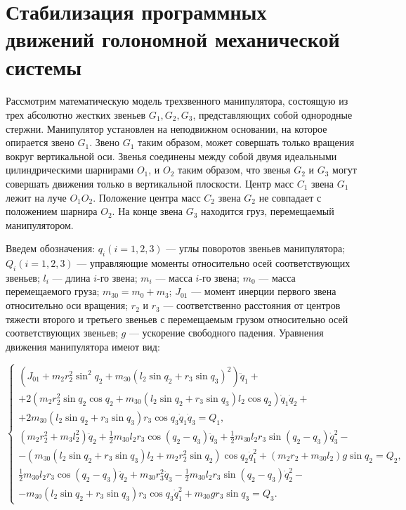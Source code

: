 \section{Стабилизация программных движений голономной механической системы } \label{p31}
\paragraph{}
 Рассмотрим математическую модель трехзвенного манипулятора, состоящую из трех абсолютно жестких звеньев $G_1, G_2, G_3$, представляющих собой однородные стержни. Манипулятор установлен на неподвижном основании, на которое опирается звено $G_1$. Звено $G_1$ таким образом, может совершать только вращения вокруг вертикальной оси. Звенья соединены между собой двумя идеальными цилиндрическими шарнирами $O_1$, и $O_2$ таким образом, что звенья $G_2$ и $G_3$ могут совершать движения только в вертикальной плоскости. Центр масс $C_1$ звена $G_1$ лежит на луче  $O_1 O_2$. Положение центра масс $C_2$ звена $G_2$ не совпадает с положением шарнира $O_2$. На конце звена $G_3$ находится груз, перемещаемый манипулятором.
 
 Введем обозначения: $q_i (i=1, 2, 3)$ --- углы поворотов звеньев манипулятора; $Q_i (i = 1, 2, 3)$ ---  управляющие моменты относительно осей соответствующих звеньев; $l_i$  ---  длина   $i$-го звена;   $m_i$ --- масса  $i$-го звена;    $m_0$ ---  масса перемещаемого груза;  $m_{30} = m_0 + m_3$; $J_{01}$  ---  момент инерции первого звена относительно оси вращения; $r_2$ и $r_3$ --- соответственно расстояния от центров тяжести второго и третьего звеньев с перемещаемым грузом относительно осей соответствующих звеньев; $g$ --- ускорение свободного падения.
 Уравнения движения манипулятора имеют вид:
 
 \begin{equation}
 \begin{cases}
 (J_{01} + m_2 r_2^2 \sin^2 q_2 + m_{30} (l_2 \sin q_2 + r_3 \sin q_3)^2) \ddot q_1 + \\ + 2 (m_2 r_2^2 \sin q_2 \cos q_2 + m_{30} (l_2 \sin q_2 + r_3 \sin q_3) l_2 \cos q_2) \dot q_1 \dot q_2 + \\ + 2 m_{30} (l_2 \sin q_2 + r_3 \sin q_3) r_3 \cos q_3 \dot q_1 \dot q_3 = Q_1,
 \\
 (m_2 r_2^2 + m_3 l_2^2) \ddot q_2 + \frac12 m_{30} l_2 r_3 \cos(q_2 - q_3) \ddot q_3 + \frac12 m_{30} l_2 r_3 \sin (q_2 - q_3) \dot q_3^2 - \\ - (m_{30} (l_2 \sin q_2 + r_3 \sin q_3) l_2 + m_2 r_2^2 \sin q_2) \cos q_2 \dot q_1^2 + (m_2 r_2 + m_{30} l_2) g \sin q_2 = Q_2,
 \\
 \frac12 m_{30} l_2 r_3 \cos(q_2 - q_3) \ddot q_2 + m_{30} r_3^2 \ddot q_3 - \frac12 m_{30} l_2 r_3 \sin (q_2 - q_3) \dot q_2^2 - \\ - m_{30} (l_2 \sin q_2 + r_3 \sin q_3) r_3 \cos q_3 \dot q_1^2 + m_{30} g r_3 \sin q_3 = Q_3.
 \end{cases}
 \end{equation}
 
